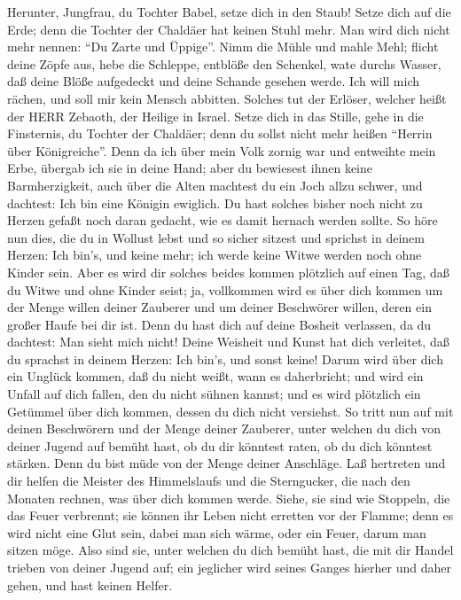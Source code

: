  Herunter, Jungfrau, du Tochter Babel, setze dich in den
Staub! Setze dich auf die Erde; denn die Tochter der Chaldäer hat keinen
Stuhl mehr. Man wird dich nicht mehr nennen: ``Du Zarte und Üppige''.
 Nimm die Mühle und mahle Mehl; flicht deine Zöpfe aus, hebe
die Schleppe, entblöße den Schenkel, wate durchs Wasser, 
daß deine Blöße aufgedeckt und deine Schande gesehen werde. Ich will
mich rächen, und soll mir kein Mensch abbitten.  Solches tut
der Erlöser, welcher heißt der HERR Zebaoth, der Heilige in Israel.
 Setze dich in das Stille, gehe in die Finsternis, du
Tochter der Chaldäer; denn du sollst nicht mehr heißen ``Herrin über
Königreiche''.  Denn da ich über mein Volk zornig war und
entweihte mein Erbe, übergab ich sie in deine Hand; aber du bewiesest
ihnen keine Barmherzigkeit, auch über die Alten machtest du ein Joch
allzu schwer,  und dachtest: Ich bin eine Königin ewiglich.
Du hast solches bisher noch nicht zu Herzen gefaßt noch daran gedacht,
wie es damit hernach werden sollte.  So höre nun dies, die
du in Wollust lebst und so sicher sitzest und sprichst in deinem Herzen:
Ich bin's, und keine mehr; ich werde keine Witwe werden noch ohne Kinder
sein.  Aber es wird dir solches beides kommen plötzlich auf
einen Tag, daß du Witwe und ohne Kinder seist; ja, vollkommen wird es
über dich kommen um der Menge willen deiner Zauberer und um deiner
Beschwörer willen, deren ein großer Haufe bei dir ist. 
Denn du hast dich auf deine Bosheit verlassen, da du dachtest: Man sieht
mich nicht! Deine Weisheit und Kunst hat dich verleitet, daß du sprachst
in deinem Herzen: Ich bin's, und sonst keine!  Darum wird
über dich ein Unglück kommen, daß du nicht weißt, wann es daherbricht;
und wird ein Unfall auf dich fallen, den du nicht sühnen kannst; und es
wird plötzlich ein Getümmel über dich kommen, dessen du dich nicht
versiehst.  So tritt nun auf mit deinen Beschwörern und der
Menge deiner Zauberer, unter welchen du dich von deiner Jugend auf
bemüht hast, ob du dir könntest raten, ob du dich könntest stärken.
 Denn du bist müde von der Menge deiner Anschläge. Laß
hertreten und dir helfen die Meister des Himmelslaufs und die
Sterngucker, die nach den Monaten rechnen, was über dich kommen werde.
 Siehe, sie sind wie Stoppeln, die das Feuer verbrennt; sie
können ihr Leben nicht erretten vor der Flamme; denn es wird nicht eine
Glut sein, dabei man sich wärme, oder ein Feuer, darum man sitzen möge.
 Also sind sie, unter welchen du dich bemüht hast, die mit
dir Handel trieben von deiner Jugend auf; ein jeglicher wird seines
Ganges hierher und daher gehen, und hast keinen Helfer.

